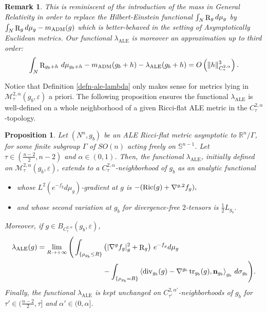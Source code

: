 \documentclass[a4paper,11pt,reqno]{amsart}
\newtheorem{prop}[defn]{Proposition}
\newtheorem{rk}[defn]{Remark}
\def\RR{\mathbb{R}}
\def\Ric{\mathop{\rm Ric}\nolimits}
\def\tr{\mathop{\rm tr}\nolimits}
\def\div{\mathop{\rm div}\nolimits}
\def\Ric{\mathop{\rm Ric}\nolimits}
\def\tr{\mathop{\rm tr}\nolimits}
\def\div{\mathop{\rm div}\nolimits}
\def\R{\mathop{\rm R}\nolimits}
\numberwithin{equation}{section}
\begin{document}
	\begin{rk}
		This is reminiscent of the introduction of the mass in General Relativity in order to replace the Hilbert-Einstein functional $\int_N\R_gd\mu_g$ by $\int_N\R_gd\mu_g-m_{\operatorname{ADM}}(g)$ which is better-behaved in the setting of  Asymptotically Euclidean metrics. Our functional $\lambda_{\operatorname{ALE}}$ is moreover an approximation up to third order:
		$$\int_N\R_{g_b+h}\,d\mu_{g_b+h}-m_{\operatorname{ADM}}(g_b+h)- \lambda_{\operatorname{ALE}}(g_b+h) = O\left(\|h\|^3_{C^{2,\alpha}_\tau}\right).$$
	\end{rk}
	Notice that Definition \ref{defn-ale-lambda} only makes sense for metrics lying in $\mathcal{M}^{2,\alpha}_{\tau}(g_b,\varepsilon)$ a priori. The following proposition ensures the functional $\lambda_{\operatorname{ALE}}$ is well-defined on a whole neighborhood of a given Ricci-flat ALE metric in the $C^{2,\alpha}_{\tau}$-topology.
	\begin{prop}\label{lambdaALE analytic}
		Let $(N^n,g_b)$ be an ALE Ricci-flat metric asymptotic to $\RR^n\slash\Gamma$, for some finite subgroup $\Gamma$ of $SO(n)$ acting freely on $\mathbb{S}^{n-1}$. Let $\tau\in(\frac{n-2}{2},n-2)$ and $\alpha\in(0,1)$. Then, the functional $\lambda_{\operatorname{ALE}}$, initially defined on $\mathcal{M}^{2,\alpha}_{\tau}(g_b,\varepsilon)$, extends to a $C^{2,\alpha}_\tau$-neighborhood of $ g_b $ as an analytic functional
		\begin{itemize}
			\item whose $L^2(e^{-f_g}d\mu_g)$-gradient at $g$ is $-(\Ric(g)+\nabla^{g,2}f_g),$
			\item and whose second variation at $g_b$ for divergence-free $2$-tensors is $\frac{1}{2}L_{g_b}$.
		\end{itemize}
		Moreover, if $g\in B_{C^{2,\alpha}_{\tau}}(g_b,\varepsilon)$,
		\begin{equation}
		\begin{split}
\lambda_{\operatorname{ALE}}(g)=\lim_{R\rightarrow+\infty}\Bigg(\int_{\{\rho_{g_b}\leq R\}}&\left(|\nabla^{g}f_{g}|^2_{g}+\R_{g}\right)\,e^{-f_{g}}d\mu_{g}\\
&-\int_{\{\rho_{g_b}=R\}}\left<\div_{g_b}(g)-\nabla^{g_b}\tr_{g_b}(g),\mathbf{n}_{g_b}\right>_{g_b}\,d\sigma_{g_b}\Bigg).\label{true-def-lambda}
\end{split}
\end{equation}
Finally, the functional $\lambda_{\operatorname{ALE}}$ is kept unchanged on $C^{2,\alpha'}_{\tau'}$-neighborhoods of $g_b$ for $\tau'\in (\frac{n-2}{2},\tau]$ and $\alpha'\in(0,\alpha]$.
	\end{prop}
\end{document}
